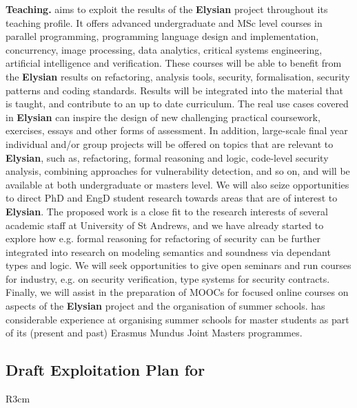 \documentclass[a4paper,11pt]{article}
\newcommand{\project}[1]{\textbf{#1}\xspace}
\newcommand{\SECURITY}{\project{Elysian}}
\newcommand{\TheProject}{\SECURITY}
\begin{document}
\textbf{Teaching.} \SA aims to exploit the results of the \TheProject{} project throughout its teaching profile. It offers advanced undergraduate and  MSc %
level courses in parallel programming, programming language design and implementation, concurrency, image processing, data analytics, critical systems engineering, artificial intelligence and verification. These courses will be able to benefit from the \TheProject{} results on refactoring, analysis tools, security, formalisation, security patterns and coding standards. Results will be integrated into the material that is taught, and contribute to an up to date curriculum. %
The real use cases covered in \TheProject{} can inspire the design of new challenging practical coursework, exercises, essays and other forms of assessment. In addition, large-scale %
final year individual and/or group projects will be offered on topics that are relevant to \TheProject{},
such as, %
refactoring, formal reasoning and logic,  code-level security analysis, combining approaches for
vulnerability detection, and so on, 
and will be available at both undergraduate or masters level. We will also seize opportunities to direct PhD and EngD student research towards areas that are of interest to \TheProject{}. The proposed work is a close fit to the research interests of several academic staff at University of St Andrews, and we have already started to explore how e.g. formal reasoning for refactoring of security can be further integrated into research on modeling semantics and soundness via dependant types and logic. We will seek opportunities to give open seminars and run courses for industry, e.g. on 
security verification, type systems for security contracts. Finally, we will assist \UODshort{} in the preparation of MOOCs for focused online courses on aspects of the \TheProject{} project and the organisation of summer schools. \SA has considerable experience at organising summer schools for master students as part of its (present and past) Erasmus Mundus Joint Masters programmes.

\horizontalline

\subsection*{Draft Exploitation Plan for \UODshort{}}

\begin{wrapfigure}{R}{3cm}
\vspace{-1.4cm}
\hfill {}
\vspace{-0.9cm}
\end{wrapfigure}
\end{document}
